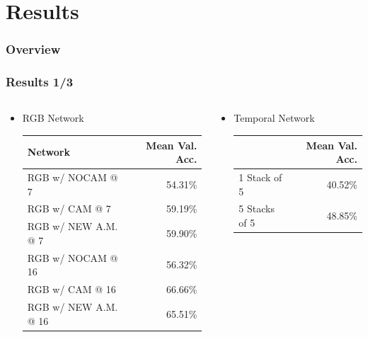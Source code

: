 \documentclass{beamer}
\begin{document}
\section{Results}

\begin{frame}
\frametitle{Overview} 
	\tableofcontents[currentsection]
\end{frame}

\begin{frame}
\frametitle{Results 1/3}

	{ \footnotesize 
	\begin{columns}[t]
		\begin{column}{.65\textwidth}
			\begin{itemize}
				\item RGB Network \\
				\vspace*{8pt}
				\begin{tabular}{l|r}
					Network & Mean Val. Acc. \\
					\hline
					RGB w/ NOCAM @ 7 & 54.31\% \\
					RGB w/ CAM @ 7 & 59.19\% \\
					RGB w/ NEW A.M. @ 7 & 59.90\% \\
					\hline
					RGB w/ NOCAM @ 16 & 56.32\% \\
					RGB w/ CAM @ 16 & 66.66\% \\
					RGB w/ NEW A.M. @ 16 & 65.51\% \\
				\end{tabular}
			\end{itemize}
		\end{column}
		\begin{column}{.7\textwidth}
				\begin{itemize}
					\item Temporal Network \\
					\vspace*{8pt}
					\begin{tabular}{l|r}
						& Mean Val. Acc. \\
						\hline
						1 Stack of 5 & 40.52\% \\
						5 Stacks of 5 & 48.85\% \\
					\end{tabular}
				\end{itemize}


\end{column}
\end{columns}}
\end{frame}
\end{document}
